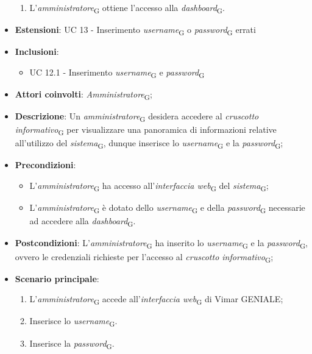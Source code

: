 \begin{itemize}
\begin{enumerate}
    \item L’\textit{amministratore}\textsubscript{G} ottiene l’accesso alla \textit{dashboard}\textsubscript{G}.
    \end{enumerate}
    \item \textbf{Estensioni}: UC 13 - Inserimento \textit{username}\textsubscript{G} o \textit{password}\textsubscript{G} errati
    \item \textbf{Inclusioni}: 
        \begin{itemize}
            \item UC 12.1 - Inserimento \textit{username}\textsubscript{G} e \textit{password}\textsubscript{G}
        \end{itemize}
\end{itemize}


\begin{itemize}
    \item \textbf{Attori coinvolti}: \textit{Amministratore}\textsubscript{G};
    \item \textbf{Descrizione}: Un \textit{amministratore}\textsubscript{G} desidera accedere al \textit{cruscotto informativo}\textsubscript{G} per visualizzare una panoramica di informazioni relative all’utilizzo del \textit{sistema}\textsubscript{G}, dunque inserisce lo \textit{username}\textsubscript{G} e la \textit{password}\textsubscript{G};
    \item \textbf{Precondizioni}: 
        \begin{itemize}
            \item L’\textit{amministratore}\textsubscript{G} ha accesso all’\textit{interfaccia web}\textsubscript{G} del \textit{sistema}\textsubscript{G};
            \item L’\textit{amministratore}\textsubscript{G} è dotato dello \textit{username}\textsubscript{G} e della \textit{password}\textsubscript{G} necessarie ad accedere alla \textit{dashboard}\textsubscript{G}.
        \end{itemize}
    \item \textbf{Postcondizioni}: L’\textit{amministratore}\textsubscript{G} ha inserito lo \textit{username}\textsubscript{G} e la \textit{password}\textsubscript{G}, ovvero le credenziali richieste per l’accesso al \textit{cruscotto informativo}\textsubscript{G};
    \item \textbf{Scenario principale}:
    \begin{enumerate}
    \item L’\textit{amministratore}\textsubscript{G} accede all’\textit{interfaccia web}\textsubscript{G} di Vimar GENIALE;
    \item Inserisce lo \textit{username}\textsubscript{G}.
    \item Inserisce la \textit{password}\textsubscript{G}.
    \end{enumerate}
\end{itemize}


